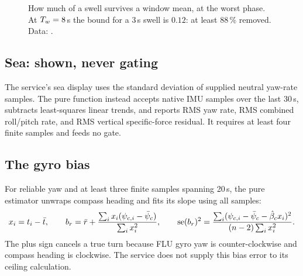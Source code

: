 \begin{figure}[ht]
\centering
{}
\caption{How much of a swell survives a window mean, at the worst phase. At
$T_w = 8$\,s the bound for a 3\,s swell is $0.12$: at least 88\,\% removed. Data:
.}
\label{fig:cond-narrowband}
\end{figure}

\subsection{Sea: shown, never gating}

The service's sea display uses the standard deviation of supplied neutral
yaw-rate samples. The pure  function instead accepts native IMU
samples over the last 30\,s, subtracts least-squares linear trends, and reports
RMS yaw rate, RMS combined roll/pitch rate, and RMS vertical specific-force
residual. It requires at least four finite samples and feeds no gate.

\subsection{The gyro bias}

For reliable yaw and at least three finite samples spanning 20\,s, the pure
estimator unwraps compass heading and fits its slope using all samples:
\[
 x_i=t_i-\bar t,\qquad
 b_r=\bar r+\frac{\sum_i x_i(\psi_{c,i}-\bar\psi_c)}{\sum_i x_i^2},\qquad
 \mathrm{se}(b_r)^2=\frac{\sum_i(\psi_{c,i}-\bar\psi_c-\hat\beta_c x_i)^2}
 {(n-2)\sum_i x_i^2}.
\]
The plus sign cancels a true turn because FLU gyro yaw is counter-clockwise
and compass heading is clockwise. The service does not supply this bias error
to its ceiling calculation.

